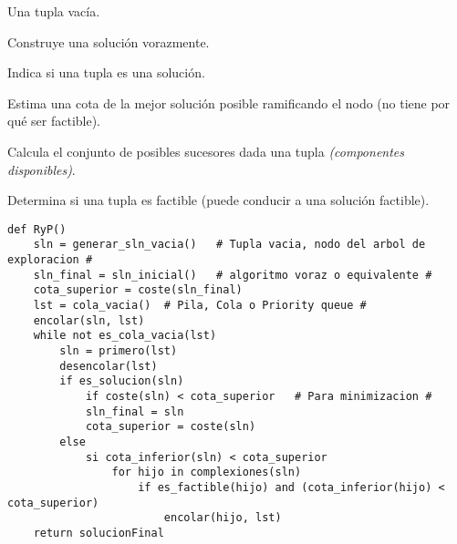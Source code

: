 \begin{definition} Una tupla vacía. \end{definition}
\begin{definition} Construye una solución vorazmente. \end{definition}
\begin{definition}[es\_sln()] Indica si una tupla es una solución. \end{definition}
\begin{definition} Estima una cota de la mejor solución posible ramificando el nodo (no tiene por qué ser factible). \end{definition}
\begin{definition}[complexiones()] Calcula el conjunto de posibles sucesores dada una tupla \textit{(componentes disponibles)}. \end{definition}
\begin{definition}[es\_factible()] Determina si una tupla es factible (puede conducir a una solución factible). \end{definition}

\begin{lstlisting}
def RyP()
    sln = generar_sln_vacia()   # Tupla vacia, nodo del arbol de exploracion #
    sln_final = sln_inicial()   # algoritmo voraz o equivalente #
    cota_superior = coste(sln_final)
    lst = cola_vacia()  # Pila, Cola o Priority queue #
    encolar(sln, lst)
    while not es_cola_vacia(lst)
        sln = primero(lst)
        desencolar(lst)
        if es_solucion(sln)
            if coste(sln) < cota_superior   # Para minimizacion #
            sln_final = sln
            cota_superior = coste(sln)
        else
            si cota_inferior(sln) < cota_superior
                for hijo in complexiones(sln)
                    if es_factible(hijo) and (cota_inferior(hijo) < cota_superior)
                        encolar(hijo, lst)
    return solucionFinal
\end{lstlisting}

